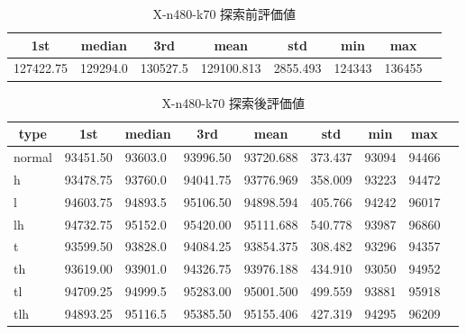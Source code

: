 \begin{table}[htbp]
    \caption{X-n480-k70 探索前評価値}
    \begin{tabular}{|l|l|l|l|l|l|l|l|}\hline
    \multicolumn{1}{|c|}{\textbf{1st}}
    &\multicolumn{1}{c|}{\textbf{median}}
    &\multicolumn{1}{c|}{\textbf{3rd}}
    &\multicolumn{1}{c|}{\textbf{mean}}
    &\multicolumn{1}{c|}{\textbf{std}}
    &\multicolumn{1}{c|}{\textbf{min}}
    &\multicolumn{1}{c|}{\textbf{max}}\\\hline
	127422.75 & 129294.0 & 130527.5 & 129100.813 & 2855.493 & 124343 & 136455\\\hline
	\end{tabular}
\end{table}
\begin{table}[htbp]
    \caption{X-n480-k70 探索後評価値}
    \begin{tabular}{|l|l|l|l|l|l|l|l|l|}\hline
    \multicolumn{1}{|c|}{\textbf{type}}
    &\multicolumn{1}{|c|}{\textbf{1st}}
    &\multicolumn{1}{c|}{\textbf{median}}
    &\multicolumn{1}{c|}{\textbf{3rd}}
    &\multicolumn{1}{c|}{\textbf{mean}}
    &\multicolumn{1}{c|}{\textbf{std}}
    &\multicolumn{1}{c|}{\textbf{min}}
    &\multicolumn{1}{c|}{\textbf{max}}\\\hline
	normal & 93451.50 & 93603.0 & 93996.50 & 93720.688 & 373.437 & 93094 & 94466\\\hline
	h & 93478.75 & 93760.0 & 94041.75 & 93776.969 & 358.009 & 93223 & 94472\\\hline
	l & 94603.75 & 94893.5 & 95106.50 & 94898.594 & 405.766 & 94242 & 96017\\\hline
	lh & 94732.75 & 95152.0 & 95420.00 & 95111.688 & 540.778 & 93987 & 96860\\\hline
	t & 93599.50 & 93828.0 & 94084.25 & 93854.375 & 308.482 & 93296 & 94357\\\hline
	th & 93619.00 & 93901.0 & 94326.75 & 93976.188 & 434.910 & 93050 & 94952\\\hline
	tl & 94709.25 & 94999.5 & 95283.00 & 95001.500 & 499.559 & 93881 & 95918\\\hline
	tlh & 94893.25 & 95116.5 & 95385.50 & 95155.406 & 427.319 & 94295 & 96209\\\hline
	\end{tabular}
\end{table}
